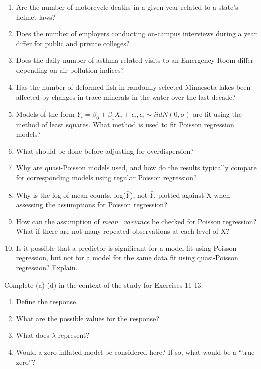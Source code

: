 \documentclass[
]{krantz}
\providecommand{\tightlist}{%
  \setlength{\itemsep}{0pt}\setlength{\parskip}{0pt}}
\begin{document}
\begin{enumerate}
\def\labelenumi{\arabic{enumi}.}
\tightlist
\item
  Are the number of motorcycle deaths in a given year related to a state's helmet laws?
\item
  Does the number of employers conducting on-campus interviews during a year differ for public and private colleges?
\item
  Does the daily number of asthma-related visits to an Emergency Room differ depending on air pollution indices?
\item
  Has the number of deformed fish in randomly selected Minnesota lakes been affected by changes in trace minerals in the water over the last decade?
  \vspace{3mm}
\item
  Models of the form \(Y_i=\beta_0+\beta_1X_i+\epsilon_i, \epsilon_i \sim iidN(0,\sigma)\) are fit using the method of least squares. What method is used to fit Poisson regression models?
\item
  What should be done before adjusting for overdispersion?
\item
  Why are quasi-Poisson models used, and how do the results typically compare for corresponding models using regular Poisson regression?
\item
  Why is the log of mean counts, log(\(\bar{Y}\)), not \(\bar{Y}\), plotted against X when assessing the assumptions for Poisson regression?
\item
  How can the assumption of \emph{mean=variance} be checked for Poisson regression? What if there are not many repeated observations at each level of X?
\item
  Is it possible that a predictor is significant for a model fit using Poisson regression, but not for a model for the same data fit using quasi-Poisson regression? Explain.
\end{enumerate}

Complete (a)-(d) in the context of the study for Exercises 11-13.

\begin{enumerate}
\def\labelenumi{\alph{enumi}.}
\tightlist
\item
  Define the response.
\item
  What are the possible values for the response?
\item
  What does \(\lambda\) represent?
\item
  Would a zero-inflated model be considered here? If so, what would be a ``true zero''?
\end{enumerate}
\end{document}
